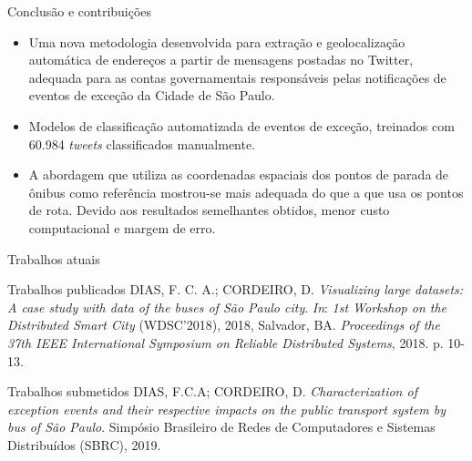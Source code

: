 \documentclass{beamer}
\begin{document}
\begin{frame}{Conclusão e contribuições}
\begin{itemize}
\item Uma nova metodologia desenvolvida para \alert{extração e geolocalização automática de endereços a partir de mensagens postadas no Twitter}, adequada para as \alert{contas governamentais responsáveis pelas notificações de eventos de exceção da Cidade de São Paulo}.
\item  Modelos de \alert{classificação automatizada de eventos de exceção,  treinados com 60.984 \textit{tweets} classificados manualmente}.
\item A abordagem que utiliza as coordenadas espaciais dos \alert{pontos de parada de ônibus como referência} mostrou-se mais adequada do que a que usa os pontos de rota. Devido aos resultados semelhantes obtidos, \alert{menor custo computacional e margem de erro}.
\end{itemize}
\end{frame}
\begin{frame}{Trabalhos atuais}
\begin{block}{Trabalhos publicados}
DIAS, F. C. A.; CORDEIRO, D. \textit{Visualizing large datasets: A case study with data of the buses of São Paulo city}. \textit{In}: \textit{1st Workshop on the Distributed Smart City} (WDSC'2018), 2018, Salvador, BA. \textit{Proceedings of the 37th IEEE International Symposium on Reliable Distributed Systems}, 2018. p. 10-13.
\end{block}

\begin{block}{Trabalhos submetidos}
DIAS, F.C.A; CORDEIRO, D. \textit{Characterization of exception events and their respective impacts on the public transport system by bus of São Paulo}. Simpósio Brasileiro de Redes de Computadores e Sistemas Distribuídos (SBRC), 2019.
\end{block}
\end{frame}
\end{document}
